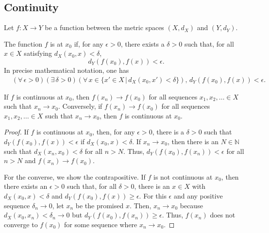 \subsection{Continuity}

Let $f \colon X \rightarrow Y$ be a function between the metric spaces $(X,d_X)$ and $(Y,d_Y)$.
\begin{definition}
The function $f$ is  at $x_0$ if, for any $\epsilon> 0$, there exists a $\delta >0$ such that, for all $x\in X$ satisfying $d_X(x_0,x)< \delta$, 
\[ d_Y \left( f(x_0),f(x) \right) < \epsilon .\]
In precise mathematical notation, one has
\begin{equation*}
\begin{split}
&(\forall \, \epsilon >0) ( \exists \, \delta >0)(\forall \, x \in \{x'\in X\,|\,d_X (x_0,x')<\delta\}),  \, d_Y \left( f(x_0),f(x) \right) < \epsilon .
\end{split}
\end{equation*}
\end{definition}

\begin{theorem} \label{thm:cont_fun_limit}
If $f$ is continuous at $x_0$, then $f(x_n) \to f(x_0)$ for all sequences $x_1,x_2,\ldots \in X$ such that $x_n \to x_0$.
Conversely, if $f(x_n) \to f(x_0)$ for all sequences $x_1,x_2,\ldots  \in X$ such that $x_n \to x_0$, then $f$ is continuous at $x_0$.
\end{theorem}
\begin{proof}
If $f$ is continuous at $x_0$, then, for any $\epsilon > 0$, there is a $\delta >0$ such that $d_Y (f(x_0),f(x)) < \epsilon$ if $d_X (x_0,x) < \delta$.
If $x_n \to x_0$, then there is an $N\in \mathbb{N}$ such that $d_X (x_n,x_0) < \delta$ for all $n>N$.
Thus, $d_Y (f(x_0),f(x_n)) < \epsilon$ for all $n>N$ and $f(x_n) \to f(x_0)$.

For the converse, we show the contrapositive.
If $f$ is not continuous at $x_0$, then there exists an $\epsilon >0$ such that, for all $\delta >0$, there is an $x\in X$ with $d_X (x_0,x) < \delta$ and $d_Y (f(x_0),f(x))\geq \epsilon$.
For this $\epsilon$ and any positive sequence $\delta_n \to 0$, let $x_n$ be the promised $x$.
Then, $x_n \to x_0$ because $d_X (x_0,x_n)<\delta_n \to 0$ but $d_Y (f(x_0),f(x_n))\geq \epsilon$.
Thus, $f(x_n)$ does not converge to $f(x_0)$ for some sequence where $x_n \to x_0$.
\end{proof}

